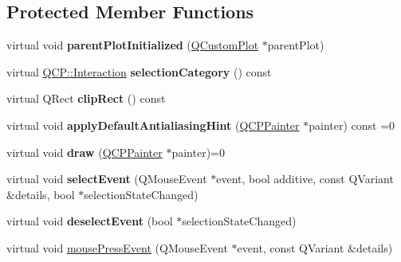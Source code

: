 \subsection*{Protected Member Functions}
\begin{DoxyCompactItemize}
\item 
\mbox{\label{class_q_c_p_layerable_ab20b7dbd8e0249ed61adb9622c427382}} 
virtual void {\bfseries parent\+Plot\+Initialized} (\mbox{\hyperlink{class_q_custom_plot}{Q\+Custom\+Plot}} $\ast$parent\+Plot)
\item 
\mbox{\label{class_q_c_p_layerable_a908c9edda761886f33893be326dab77d}} 
virtual \mbox{\hyperlink{namespace_q_c_p_a2ad6bb6281c7c2d593d4277b44c2b037}{Q\+C\+P\+::\+Interaction}} {\bfseries selection\+Category} () const
\item 
\mbox{\label{class_q_c_p_layerable_acbcfc9ecc75433747b1978a77b1864b3}} 
virtual Q\+Rect {\bfseries clip\+Rect} () const
\item 
\mbox{\label{class_q_c_p_layerable_afdf83ddc6a265cbf4c89fe99d3d93473}} 
virtual void {\bfseries apply\+Default\+Antialiasing\+Hint} (\mbox{\hyperlink{class_q_c_p_painter}{Q\+C\+P\+Painter}} $\ast$painter) const =0
\item 
\mbox{\label{class_q_c_p_layerable_aecf2f7087482d4b6a78cb2770e5ed12d}} 
virtual void {\bfseries draw} (\mbox{\hyperlink{class_q_c_p_painter}{Q\+C\+P\+Painter}} $\ast$painter)=0
\item 
\mbox{\label{class_q_c_p_layerable_a7498c2d0d081cf7cad0fb3bb93aa0e91}} 
virtual void {\bfseries select\+Event} (Q\+Mouse\+Event $\ast$event, bool additive, const Q\+Variant \&details, bool $\ast$selection\+State\+Changed)
\item 
\mbox{\label{class_q_c_p_layerable_ae546370644a5551c76af739afc008bee}} 
virtual void {\bfseries deselect\+Event} (bool $\ast$selection\+State\+Changed)
\item 
virtual void \mbox{\hyperlink{class_q_c_p_layerable_af6567604818db90f4fd52822f8bc8376}{mouse\+Press\+Event}} (Q\+Mouse\+Event $\ast$event, const Q\+Variant \&details)
\item 

\end{DoxyCompactItemize}
